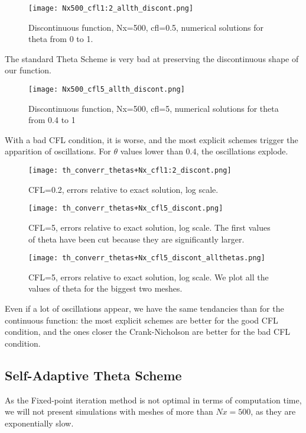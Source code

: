 \documentclass[12pt]{article}
\begin{document}
\begin{figure}[H]
    \centering
    \texttt{[image: Nx500\_cfl1:2\_allth\_discont.png]}
    \caption{Discontinuous function, Nx=500, cfl=0.5, numerical solutions for theta from 0 to 1.}
\end{figure}
The standard Theta Scheme is very bad at preserving the discontinuous shape of our function.

\begin{figure}[H]
    \centering
    \texttt{[image: Nx500\_cfl5\_allth\_discont.png]}
    \caption{Discontinuous function, Nx=500, cfl=5, numerical solutions for theta from 0.4 to 1}
\end{figure}
With a bad CFL condition, it is worse, and the most explicit schemes trigger the apparition of oscillations. For $\theta$ values lower than $0.4$, the oscillations explode.

\begin{figure}[H]
    \centering
    \texttt{[image: th\_converr\_thetas+Nx\_cfl1:2\_discont.png]}
    \caption{CFL=0.2, errors relative to exact solution, log scale.}
\end{figure}

\begin{figure}[H]
    \centering
    \texttt{[image: th\_converr\_thetas+Nx\_cfl5\_discont.png]}
    \caption{CFL=5, errors relative to exact solution, log scale. The first values of theta have been cut because they are significantly larger.}
\end{figure}

\begin{figure}[H]
    \centering
    \texttt{[image: th\_converr\_thetas+Nx\_cfl5\_discont\_allthetas.png]}
    \caption{CFL=5, errors relative to exact solution, log scale. We plot all the values of theta for the biggest two meshes.}
\end{figure}
Even if a lot of oscillations appear, we have the same tendancies than for the continuous function:
the most explicit schemes are better for the good CFL condition, and the ones closer the Crank-Nicholson are better for the bad CFL condition.\\

\subsection*{Self-Adaptive Theta Scheme}
As the Fixed-point iteration method is not optimal in terms of computation time, we will not present simulations with meshes of more than $Nx=500$, as they are exponentially slow.\\
\end{document}
